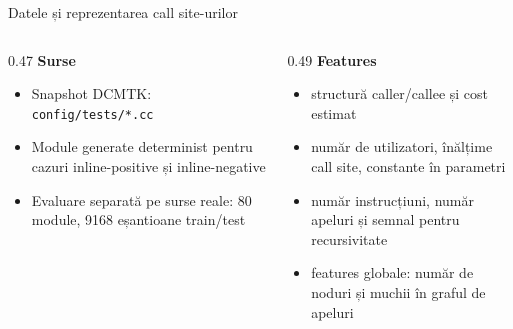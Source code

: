 \documentclass[aspectratio=169,11pt]{beamer}
\begin{document}
\begin{frame}{Datele și reprezentarea call site-urilor}
\begin{columns}[T,onlytextwidth]
\begin{column}{0.47\textwidth}
\textbf{Surse}
\begin{itemize}
  \item Snapshot DCMTK: \texttt{config/tests/*.cc}
  \item Module generate determinist pentru cazuri inline-positive și inline-negative
  \item Evaluare separată pe surse reale: 80 module, 9168 eșantioane train/test
\end{itemize}
\end{column}
\begin{column}{0.49\textwidth}
\textbf{Features}
\begin{itemize}
  \item structură caller/callee și cost estimat
  \item număr de utilizatori, înălțime call site, constante în parametri
  \item număr instrucțiuni, număr apeluri și semnal pentru recursivitate
  \item features globale: număr de noduri și muchii în graful de apeluri
\end{itemize}
\end{column}
\end{columns}
\vspace{0.35cm}
\begin{center}
\end{center}
\end{frame}
\end{document}
